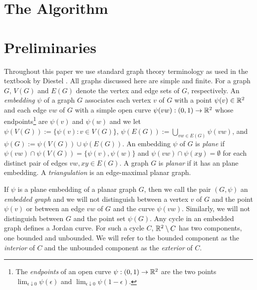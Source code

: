 \documentclass{patmorin}
\begin{document}
\section{The Algorithm}


\section{Preliminaries}

Throughout this paper we use standard graph theory terminology as used in the textbook by Diestel \cite{diestel:graph}.  All graphs discussed here are simple and finite.  For a graph $G$, $V(G)$ and $E(G)$ denote the vertex and edge sets of $G$, respectively. An \emph{embedding} $\psi$ of a graph $G$ associates each vertex $v$ of $G$ with a point $\psi(v)\in \mathbb{R}^2$ and each edge $vw$ of $G$ with a simple open curve $\psi(vw):(0,1)\to\mathbb{R}^2$ whose endpoints\footnote{The \emph{endpoints} of an open curve $\psi:(0,1)\to\mathbb{R}^2$ are the two points $\lim_{\epsilon\downarrow 0} \psi(\epsilon)$ and $\lim_{\epsilon\downarrow 0}\psi(1-\epsilon)$.} are $\psi(v)$ and $\psi(w)$ and we let $\psi(V(G)):=\{\psi(v):v\in V(G)\}$, $\psi(E(G)):=\bigcup_{vw\in E(G)} \psi(vw)$, and $\psi(G):=\psi(V(G))\cup\psi(E(G))$.  An embedding $\psi$ of $G$ is \emph{plane} if $\psi(vw)\cap\psi(V(G))=\{\psi(v),\psi(w)\}$ and $\psi(vw)\cap\psi(xy)=\emptyset$ for each distinct pair of edges $vw,xy\in E(G)$.  A graph $G$ is \emph{planar} if it has an plane embedding. A \emph{triangulation} is an edge-maximal planar graph.

If $\psi$ is a plane embedding of a planar graph $G$, then we call the pair $(G,\psi)$ an \emph{embedded graph} and we will not distinguish between a vertex $v$ of $G$ and the point $\psi(v)$ or between an edge $vw$ of $G$ and the curve $\psi(vw)$.  Similarly, we will not distinguish between $G$ and the  point set $\psi(G)$.  Any cycle in an embedded graph defines a Jordan curve. For such a cycle $C$, $\mathbb{R}^2\setminus C$ has two components, one bounded and unbounded. We will refer to the bounded component as the \emph{interior} of $C$ and the unbounded component as the \emph{exterior} of $C$.
\end{document}
